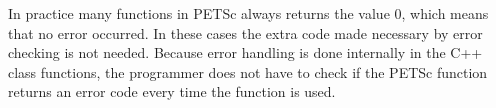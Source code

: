 In practice many functions in PETSc always returns the value 0, which means that
no error occurred. 
In these cases the extra code made necessary by error checking is not needed.
Because error handling is done internally in the C++ class functions, the
programmer does not have to check if the PETSc function returns an error code
every time the function is used.

